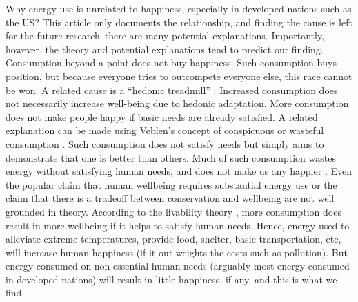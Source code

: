 \documentclass[10pt, letterpaper]{article}
\begin{document}
\begin{spacing}{1.0}
Why energy use is unrelated to happiness, especially in developed nations such
as the US? This article only
documents the relationship, and finding the cause is left for the future
research--there are many potential explanations. Importantly, however, the
theory and potential explanations tend to predict our finding. 
Consumption beyond a point does not buy happiness. Such consumption buys
position, but because everyone tries to outcompete everyone else, this race
cannot be won. A related cause is a ``hedonic treadmill'' \citep{brickman78cj}:
Increased consumption does not necessarily increase well-being due to
hedonic adaptation. More consumption does not make people happy if basic needs
are already satisfied. %
 A related explanation can be made using Veblen's concept of conspicuous or
 wasteful consumption \citep{veblen05a, veblen05b}. Such consumption does not
 satisfy needs but simply aims to demonstrate that
one is better than others. Much of such consumption wastes energy without
satisfying human needs, %
%
 and  does not make us any happier  \citep{csikszentmihalyi99, frank04, frank05,
   frank12}. %
  Even the popular claim that human wellbeing requires substantial energy use or
 the claim that there is a tradeoff between conservation and wellbeing are not
 well grounded in theory. According to the livability theory
 \citep{veenhoven14b}, more consumption does result in more wellbeing if it
 helps to satisfy human needs. Hence, energy used to alleviate extreme
 temperatures, provide food, shelter, basic transportation, etc, will increase
 human happiness (if it out-weights the costs such as pollution). But energy
 consumed on non-essential human needs (arguably most energy consumed in
 developed nations) will result in little happiness, if any, and this is what we
 find.  


\end{spacing}
\end{document}

